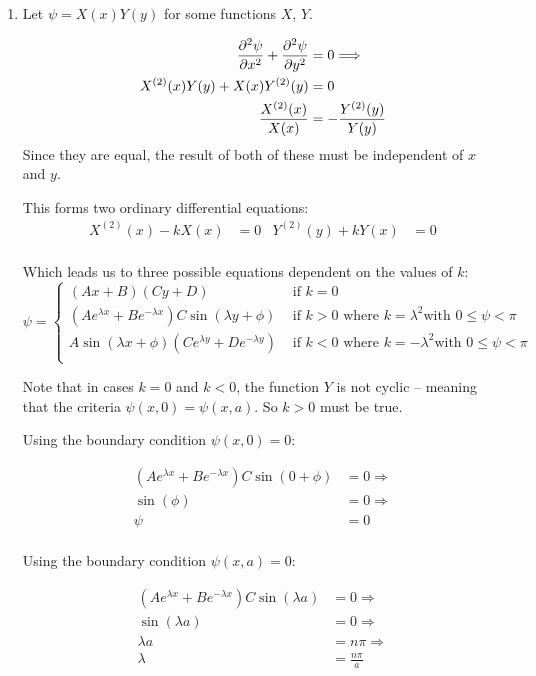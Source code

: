 \documentclass[10pt,oneside,a4paper]{article}
\begin{document}
\begin{enumerate}

\item Let $\psi = X(x)Y(y)$ for some functions $X$, $Y$.

\[
\begin{split}
\pdv[2]{\psi}{x} + \pdv[2]{\psi}{y} &= 0 \Longrightarrow \\
X^{(2)}(x)Y(y) + X(x)Y^{(2)}(y) &= 0 \\
\frac{X^{(2)}(x)}{X(x)} &= -\frac{Y^{(2)}(y)}{Y(y)} \\
\end{split}
\]
Since they are equal, the result of both of these must be independent of $x$ and $y$.

This forms two ordinary differential equations:
\begin{align*}
X^{(2)}(x) - kX(x) &= 0 & Y^{(2)}(y) + kY(x) &= 0 \\
\end{align*}

Which leads us to three possible equations dependent on the values of $k$:
\[
\psi =
\begin{cases}
(Ax + B)(Cy + D) & \text{ if } k = 0 \\
(Ae^{\lambda x} + Be^{-\lambda x})C\sin(\lambda y + \phi) & \text{ if } k > 0 \text{ where } k = \lambda^2 \text{
with } 0 \leq \psi < \pi \\
A\sin(\lambda x + \phi)(Ce^{\lambda y} + De^{-\lambda y}) & \text{ if } k < 0 \text{ where } k = - \lambda^2 \text{
with } 0 \leq \psi < \pi \\
\end{cases}
\]

Note that in cases $k = 0$ and $k < 0$, the function $Y$ is not cyclic -- meaning that the criteria $\psi(x, 0) =
\psi(x, a)$. So $k > 0$ must be true.

Using the boundary condition $\psi(x, 0) = 0$:

\[
\begin{split}
(Ae^{\lambda x} + Be^{-\lambda x})C\sin(0 + \phi) &= 0 \Longrightarrow \\
\sin(\phi) &= 0 \Longrightarrow \\
\psi &= 0 \\
\end{split}
\]

Using the boundary condition $\psi(x, a) = 0$:

\[
\begin{split}
(Ae^{\lambda x} + Be^{-\lambda x})C\sin(\lambda a) &= 0 \Longrightarrow \\
\sin(\lambda a) &= 0 \Longrightarrow \\
\lambda a &= n\pi \Longrightarrow \\
\lambda &= \frac{n\pi}{a} \\
\end{split}
\]


\end{enumerate}
\end{document}
